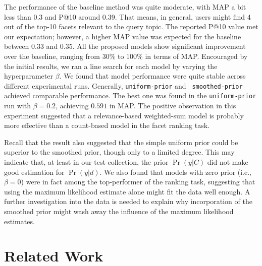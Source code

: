The performance of the baseline method was quite moderate, with MAP a bit less
than 0.3 and P@10 around 0.39.  That means, in general, users might find 4 out
of the top-10 facets relevant to the query topic.  The reported P@10 value met
our expectation; however, a higher MAP value was expected for the baseline
between 0.33 and 0.35.  All the proposed models show significant improvement
over the baseline, ranging from 30\% to 100\% in terms of MAP.  Encouraged by
the initial results, we ran a line search for each model by varying the
hyperparameter $\beta$.  We found that model performance were quite stable
across different experimental runs.  Generally, {\tt uniform-prior} and {\tt
smoothed-prior} achieved comparable performance.  The best one was found in the
{\tt uniform-prior} run with $\beta = 0.2$, achieving $0.591$ in MAP.  The
positive observation in this experiment suggested that a relevance-based
weighted-sum model is probably more effective than a count-based model in the
facet ranking task.  

Recall that the result also suggested that the simple uniform prior could be 
superior to the smoothed prior, though only to a limited degree.  This may
indicate that, at least in our test collection, the prior $\Pr(y|C)$ did not
make good estimation for $\Pr(y|d)$.  We also found that models with
zero prior (i.e., $\beta = 0$) were in fact among the top-performer of the
ranking task, suggesting that using the maximum likelihood estimate alone might
fit the data well enough.  A further investigation into the data is needed to
explain why incorporation of the smoothed prior might wash away the influence
of the maximum likelihood estimates.


\section{Related Work}\label{s:related-work}

